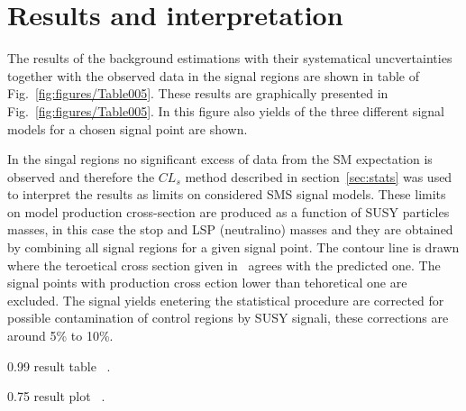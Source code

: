 \section{Results and interpretation~\label{sec:results}}

The results of the background estimations with their systematical uncvertainties together with the observed data in the signal regions are shown in table of Fig.~\ref{fig:figures/Table005}. These results are graphically presented in Fig.~\ref{fig:figures/Table005}. In this figure also yields of the three different signal models for a chosen signal point are shown. 

In the singal regions no significant excess of data from the SM expectation is observed and therefore the $CL_{s}$ method described in section~\ref{sec:stats} was used to interpret the results as limits on considered SMS signal models. These limits on model production cross-section are produced as a function of SUSY particles masses, in this case the stop and LSP (neutralino) masses and they are obtained by combining all signal regions for a given signal point. The contour line is drawn where the teroetical cross section given in~\cite{Borschensky:2014cia} agrees with the predicted one. The signal points with production cross ection lower than tehoretical one are excluded. The signal yields enetering the statistical procedure are corrected for possible contamination of control regions by SUSY signali, these corrections are around 5\% to 10\%.

                 {0.99}       %
                 { result table ~\cite{Sirunyan:2017xse}. }

                 {0.75}       %
                 { result plot ~\cite{Sirunyan:2017xse}. }

